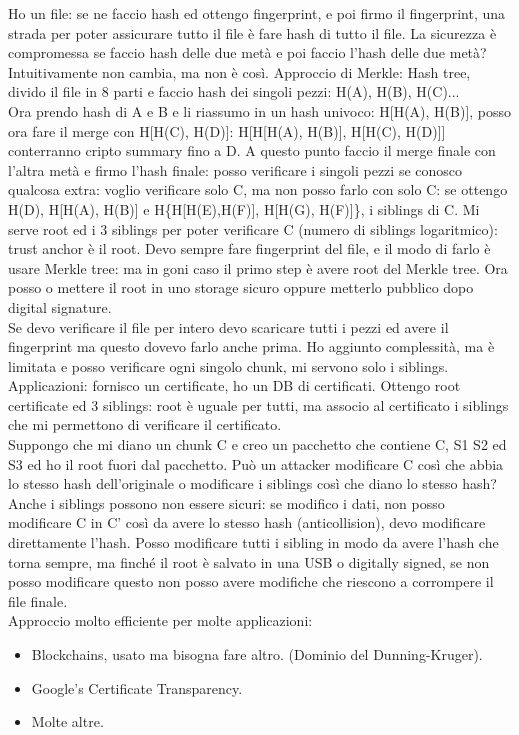 \documentclass[16px]{article}
\begin{document}
Ho un file: se ne faccio hash ed ottengo fingerprint, e poi firmo il fingerprint, una strada per poter assicurare tutto il file è fare hash di tutto il file. La sicurezza è compromessa se faccio hash delle due metà e poi faccio l'hash delle due metà? Intuitivamente non cambia,  ma non è così. Approccio di Merkle: Hash tree, divido il file in 8 parti e faccio hash dei singoli pezzi: H(A), H(B), H(C)...\\ Ora prendo hash di A e B e li riassumo in un hash univoco: H[H(A), H(B)], posso ora fare il merge con H[H(C), H(D)]: H[H[H(A), H(B)], H[H(C), H(D)]] conterranno cripto summary fino a D. A questo punto faccio il merge finale con l'altra metà e firmo l'hash finale: posso verificare i singoli pezzi se conosco qualcosa extra: voglio verificare solo C, ma non posso farlo con solo C: se ottengo H(D), H[H(A), H(B)] e H\{H[H(E),H(F)], H[H(G), H(F)]\}, i siblings di C. Mi serve root ed i 3 siblings per poter verificare C (numero di siblings logaritmico): trust anchor è il root. Devo sempre fare fingerprint del file, e il modo di farlo è usare Merkle tree: ma in goni caso il primo step è avere root del Merkle tree. Ora posso o mettere il root in uno storage sicuro oppure metterlo pubblico dopo digital signature.\\ Se devo verificare il file per intero devo scaricare tutti i pezzi ed avere il fingerprint ma questo dovevo farlo anche prima. Ho aggiunto complessità, ma è limitata e posso verificare ogni singolo chunk, mi servono solo i siblings.\\ Applicazioni: fornisco un certificate, ho un DB di certificati. Ottengo root certificate ed 3 siblings: root è uguale per tutti, ma associo al certificato i siblings che mi permettono di verificare il certificato.\\ Suppongo che mi diano un chunk C e creo un pacchetto che contiene C, S1 S2 ed S3 ed ho il root fuori dal pacchetto. Può un attacker modificare C così che abbia lo stesso hash dell'originale o modificare i siblings così che diano lo stesso hash? Anche i siblings possono non essere sicuri: se modifico i dati, non posso modificare C in C' così da avere lo stesso hash (anticollision), devo modificare direttamente l'hash. Posso modificare tutti i sibling in modo da avere l'hash che torna sempre, ma finché il root è salvato in una USB o digitally signed, se non posso modificare questo non posso avere modifiche che riescono a corrompere il file finale.\\ Approccio molto efficiente per molte applicazioni:
\begin{itemize}
\item Blockchains, usato ma bisogna fare altro. (Dominio del Dunning-Kruger).
\item Google's Certificate Transparency.
\item Molte altre.
\end{itemize}
\end{document}
